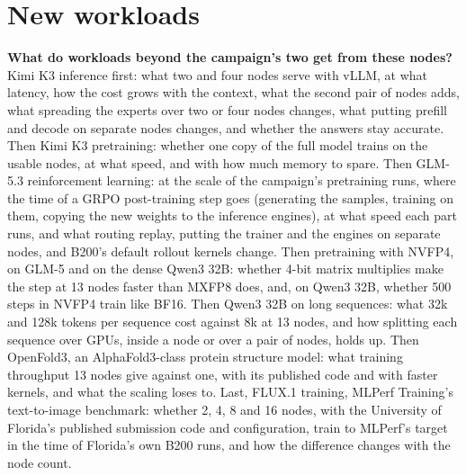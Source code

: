 \section{New workloads}
\label{sec:newworkloads}

\begin{question}
  \textbf{What do workloads beyond the campaign's two get from these nodes?} Kimi K3 inference first: what two and four nodes serve with vLLM, at what latency, how the cost grows with the context, what the second pair of nodes adds, what spreading the experts over two or four nodes changes, what putting prefill and decode on separate nodes changes, and whether the answers stay accurate. Then Kimi K3 pretraining: whether one copy of the full model trains on the usable nodes, at what speed, and with how much memory to spare. Then GLM-5.3 reinforcement learning: at the scale of the campaign's pretraining runs, where the time of a GRPO post-training step goes (generating the samples, training on them, copying the new weights to the inference engines), at what speed each part runs, and what routing replay, putting the trainer and the engines on separate nodes, and B200's default rollout kernels change. Then pretraining with NVFP4, on GLM-5 and on the dense Qwen3 32B: whether 4-bit matrix multiplies make the step at 13 nodes faster than MXFP8 does, and, on Qwen3 32B, whether 500 steps in NVFP4 train like BF16. Then Qwen3 32B on long sequences: what 32k and 128k tokens per sequence cost against 8k at 13 nodes, and how splitting each sequence over GPUs, inside a node or over a pair of nodes, holds up. Then OpenFold3, an AlphaFold3-class protein structure model: what training throughput 13 nodes give against one, with its published code and with faster kernels, and what the scaling loses to. Last, FLUX.1 training, MLPerf Training's text-to-image benchmark: whether 2, 4, 8 and 16 nodes, with the University of Florida's published submission code and configuration, train to MLPerf's target in the time of Florida's own B200 runs, and how the difference changes with the node count.
\end{question}

